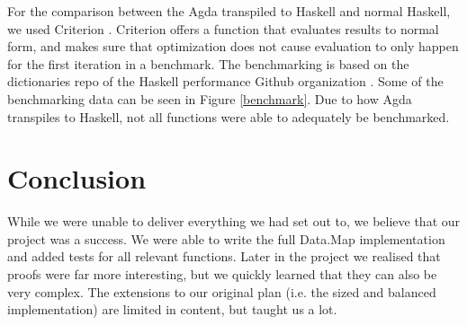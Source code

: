 \documentclass[a4paper,UKenglish,cleveref, autoref, thm-restate]{template/lipics-v2021}
\begin{document}
For the comparison between the Agda transpiled to Haskell and normal Haskell, we used Criterion \cite{criterion}. Criterion offers a function that evaluates results to normal form, and makes sure that optimization does not cause evaluation to only happen for the first iteration in a benchmark. The benchmarking is based on the dictionaries repo of the Haskell performance Github organization \cite{haskellperf}.\newline
Some of the benchmarking data can be seen in Figure \ref{benchmark}.\newline
Due to how Agda transpiles to Haskell, not all functions were able to adequately be benchmarked.





\section{Conclusion}
While we were unable to deliver everything we had set out to, we believe that our project was a success. We were able to write the full Data.Map implementation and added tests for all relevant functions. Later in the project we realised that proofs were far more interesting, but we quickly learned that they can also be very complex. The extensions to our original plan (i.e. the sized and balanced implementation) are limited in content, but taught us a lot.



\end{document}
